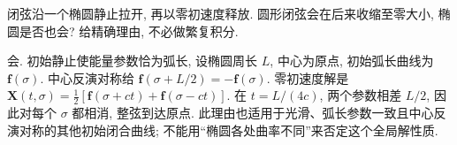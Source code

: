 \begin{exercise}
闭弦沿一个椭圆静止拉开, 再以零初速度释放. 圆形闭弦会在后来收缩至零大小, 椭圆是否也会? 给精确理由, 不必做繁复积分.
\end{exercise}
\begin{solution}
会. 初始静止使能量参数恰为弧长, 设椭圆周长 $L$, 中心为原点, 初始弧长曲线为 $\boldsymbol f(\sigma)$. 中心反演对称给
$\boldsymbol f(\sigma+L/2)=-\boldsymbol f(\sigma)$.
零初速度解是
$\boldsymbol X(t,\sigma)=\frac12[\boldsymbol f(\sigma+ct)+\boldsymbol f(\sigma-ct)]$.
在 $t=L/(4c)$, 两个参数相差 $L/2$, 因此对每个 $\sigma$ 都相消, 整弦到达原点. 此理由也适用于光滑、弧长参数一致且中心反演对称的其他初始闭合曲线; 不能用“椭圆各处曲率不同”来否定这个全局解性质.
\end{solution}

